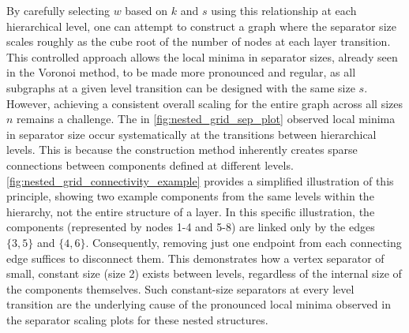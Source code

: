 By carefully selecting \(w\) based on \(k\) and \(s\) using this relationship at each hierarchical level, one can attempt to construct a graph where the separator size scales roughly as the cube root of the number of nodes at each layer transition.
This controlled approach allows the local minima in separator sizes, already seen in the Voronoi method, to be made more pronounced and regular, as all subgraphs at a given level transition can be designed with the same size \(s\).
However, achieving a consistent overall  scaling for the entire graph across all sizes \(n\) remains a challenge.
The in \cref{fig:nested_grid_sep_plot} observed local minima in separator size occur systematically at the transitions between hierarchical levels.
This is because the construction method inherently creates sparse connections between components defined at different levels.
\cref{fig:nested_grid_connectivity_example} provides a simplified illustration of this principle, showing two example components from the same levels within the hierarchy, not the entire structure of a layer.
In this specific illustration, the components (represented by nodes 1-4 and 5-8) are linked only by the edges \(\{3,5\}\) and \(\{4,6\}\).
Consequently, removing just one endpoint from each connecting edge suffices to disconnect them.
This demonstrates how a vertex separator of small, constant size (size 2) exists between levels, regardless of the internal size of the components themselves.
Such constant-size separators at every level transition are the underlying cause of the pronounced local minima observed in the separator scaling plots for these nested structures.

